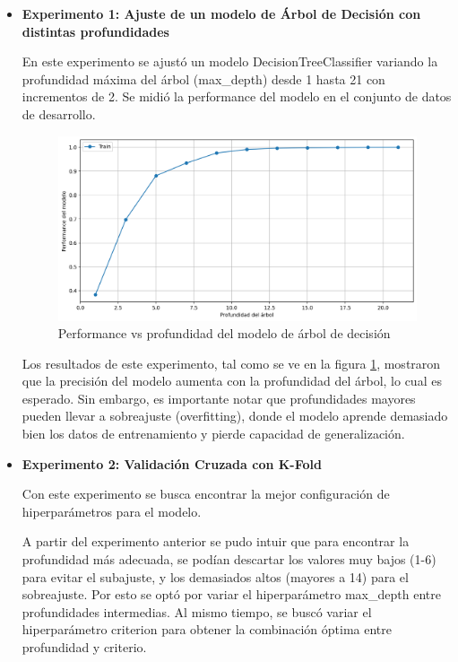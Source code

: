 \documentclass[11pt,a4paper, twocolumn]{article}
\begin{document}
\begin{itemize}
	\item[]
		\textbf{Experimento 1: Ajuste de un modelo de Árbol de Decisión con distintas profundidades}

En este experimento se ajustó un modelo DecisionTreeClassifier variando la profundidad máxima del árbol (max\_depth) desde 1 hasta 21 con incrementos de 2. Se midió la performance del modelo en el conjunto de datos de desarrollo.

\begin{figure}[H]
	\centering
	\includegraphics[scale=0.6]{figuras/3b.png}
	\caption{Performance vs profundidad del modelo de árbol de decisión}
	\label{fig:3b}
\end{figure}

Los resultados de este experimento, tal como se ve en la figura \ref{fig:3b}, mostraron que la precisión del modelo aumenta con la profundidad del árbol, lo cual es esperado. Sin embargo, es importante notar que profundidades mayores pueden llevar a sobreajuste (overfitting), donde el modelo aprende demasiado bien los datos de entrenamiento y pierde capacidad de generalización. 

	\item[]
		\textbf{Experimento 2: Validación Cruzada con K-Fold }
 
Con este experimento se busca encontrar la mejor configuración de hiperparámetros para el modelo. 

A partir del experimento anterior se pudo intuir que para encontrar la profundidad más adecuada, se podían descartar los valores muy bajos (1-6) para evitar el subajuste, y los demasiados altos (mayores a 14) para el sobreajuste. Por esto se optó por variar el hiperparámetro max\_depth entre profundidades intermedias. 
Al mismo tiempo, se buscó variar el hiperparámetro criterion para obtener la combinación óptima entre profundidad y criterio. 


\end{itemize}
\end{document}
